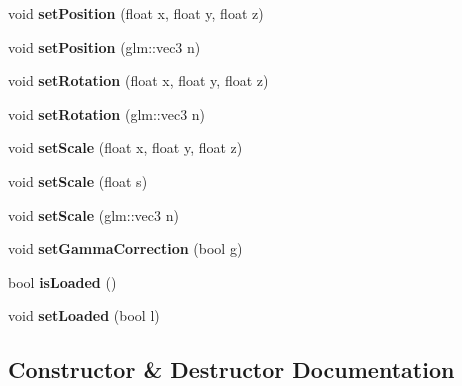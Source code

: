 \begin{DoxyCompactItemize}
void {\bfseries set\+Position} (float x, float y, float z)
\item 
\mbox{\label{classdarksun_1_1_renderable_aa52bc74eb16f47df4d63c448ca51e91f}} 
void {\bfseries set\+Position} (glm\+::vec3 n)
\item 
\mbox{\label{classdarksun_1_1_renderable_a1a0aa928bc45e88de4425523694aed2d}} 
void {\bfseries set\+Rotation} (float x, float y, float z)
\item 
\mbox{\label{classdarksun_1_1_renderable_a0ed269f244450c28b948cd75b7a87e58}} 
void {\bfseries set\+Rotation} (glm\+::vec3 n)
\item 
\mbox{\label{classdarksun_1_1_renderable_a24356cfc64a9746deae81a57d23a1d5c}} 
void {\bfseries set\+Scale} (float x, float y, float z)
\item 
\mbox{\label{classdarksun_1_1_renderable_a8fe68be0aac888c08ccd61e89873eea1}} 
void {\bfseries set\+Scale} (float s)
\item 
\mbox{\label{classdarksun_1_1_renderable_a792156010b3223f3f4dde222b21bdf25}} 
void {\bfseries set\+Scale} (glm\+::vec3 n)
\item 
\mbox{\label{classdarksun_1_1_renderable_ace56e5f83f4df86b407b8d9d9d1219a2}} 
void {\bfseries set\+Gamma\+Correction} (bool g)
\item 
\mbox{\label{classdarksun_1_1_renderable_a586b2abb05b1f727f6d987148b3a7679}} 
bool {\bfseries is\+Loaded} ()
\item 
\mbox{\label{classdarksun_1_1_renderable_addf56508301942d5ca7633b78b520fcf}} 
void {\bfseries set\+Loaded} (bool l)
\end{DoxyCompactItemize}


\subsection{Constructor \& Destructor Documentation}
\mbox{\label{classdarksun_1_1_renderable_a97a0f6efd2a058dfb003e64e63bdb255}} 
